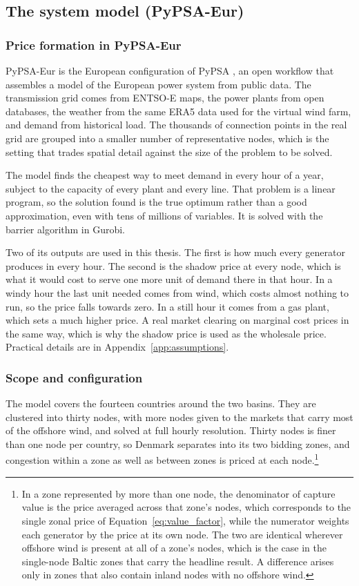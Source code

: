 \subsection{The system model (PyPSA-Eur)}\label{sec:system}

\subsubsection{Price formation in PyPSA-Eur}\label{sec:pypsa_how}

PyPSA-Eur is the European configuration of PyPSA \cite{Horsch2018}, an open
workflow that assembles a model of the European power system from public data.
The transmission grid comes from ENTSO-E maps, the power plants from open
databases, the weather from the same ERA5 data used for the virtual wind farm,
and demand from historical load. The thousands of connection points in the real
grid are grouped into a smaller number of representative nodes, which is the
setting that trades spatial detail against the size of the problem to be solved.

The model finds the cheapest way to meet demand in every hour of a year, subject
to the capacity of every plant and every line. That problem is a linear program,
so the solution found is the true optimum rather than a good approximation, even
with tens of millions of variables. It is solved with the barrier algorithm in
Gurobi.

Two of its outputs are used in this thesis. The first is how much every generator produces
in every hour. The second is the shadow price at every node, which is what it
would cost to serve one more unit of demand there in that hour. In a windy hour
the last unit needed comes from wind, which costs almost nothing to run, so the
price falls towards zero. In a still hour it comes from a gas plant, which sets
a much higher price. A real market clearing on marginal cost prices in the same
way, which is why the shadow price is used as the wholesale price.
Practical details are in Appendix~\ref{app:assumptions}.

\subsubsection{Scope and configuration}\label{sec:pypsa_config}

The model covers the fourteen countries around the two basins. They are
clustered into thirty nodes, with more nodes given to the markets that carry
most of the offshore wind, and solved at full hourly resolution. Thirty nodes is
finer than one node per country, so Denmark separates into its two  bidding
zones, and congestion within a zone as well as between zones is priced at each
node.\footnote{In a zone represented by more than one node, the denominator of
capture value is the price averaged across that zone's nodes, which corresponds
to the single zonal price of Equation~\ref{eq:value_factor}, while the numerator
weights each generator by the price at its own node. The two are identical
wherever offshore wind is present at all of a zone's nodes, which is the case in
the single-node Baltic zones that carry the headline result. A difference arises
only in zones that also contain inland nodes with no offshore wind.}

